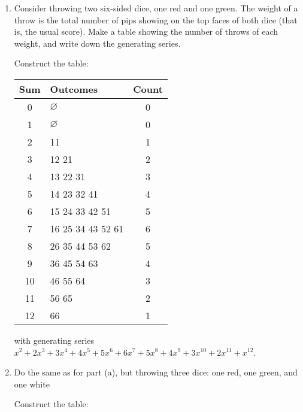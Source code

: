 \documentclass[class=math239,notes,tikz]{agony}
\begin{document}
\begin{xca}\label{xca:2-dice}\end{xca}
\begin{enumerate}
  \item Consider throwing two six-sided dice, one red and one green.
        The weight of a throw is the total number of pips showing on
        the top faces of both dice (that is, the usual score).
        Make a table showing the number of throws of each weight,
        and write down the generating series.
        \begin{sol}
          Construct the table:
          \begin{center}
            \begin{tabular}{c|l|c}
              Sum & Outcomes          & Count \\ \hline
              0   & $\varnothing$     & 0     \\
              1   & $\varnothing$     & 0     \\
              2   & 11                & 1     \\
              3   & 12 21             & 2     \\
              4   & 13 22 31          & 3     \\
              5   & 14 23 32 41       & 4     \\
              6   & 15 24 33 42 51    & 5     \\
              7   & 16 25 34 43 52 61 & 6     \\
              8   & 26 35 44 53 62    & 5     \\
              9   & 36 45 54 63       & 4     \\
              10  & 46 55 64          & 3     \\
              11  & 56 65             & 2     \\
              12  & 66                & 1
            \end{tabular}
          \end{center}
          with generating series $x^2+2x^3+3x^4+4x^5+5x^6+6x^7+5x^8+4x^9+3x^{10}+2x^{11}+x^{12}$.
        \end{sol}
  \item Do the same as for part (a), but throwing three dice:
        one red, one green, and one white
        \begin{sol}
          Construct the table:
          \begin{center}
            \tiny\begin{tabular}{c|l|c}

\end{tabular}
\end{center}
\end{sol}
\end{enumerate}
\end{document}
